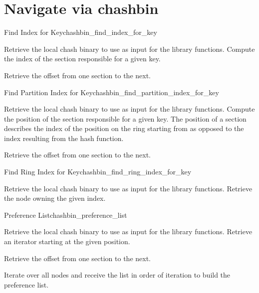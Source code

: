 \section{Navigate via chashbin}

\begin{actionbox}{Find Index for Key}{chashbin_find_index_for_key}
	\begin{action}
		 Retrieve the local chash binary to use as input for the library functions.
		 Compute the index of the section responsible for a given key.
		\begin{action}
			 Retrieve the offset from one section to the next.
		\end{action}
	\end{action}
\end{actionbox}

\begin{actionbox}{Find Partition Index for Key}{chashbin_find_partition_index_for_key}
	\begin{action}
		 Retrieve the local chash binary to use as input for the library functions.
		 Compute the position of the section responsible for a given key.
		The position of a section describes the index of the position on the ring starting from as opposed to the index resulting from the hash function.
		\begin{action}
			 Retrieve the offset from one section to the next.
		\end{action}
	\end{action}
\end{actionbox}

\begin{actionbox}{Find Ring Index for Key}{chashbin_find_ring_index_for_key}
	\begin{action}
		 Retrieve the local chash binary to use as input for the library functions.
		 Retrieve the node owning the given index.
	\end{action}
\end{actionbox}

\begin{actionbox}{Preference List}{chashbin_preference_list}
	\begin{action}
		 Retrieve the local chash binary to use as input for the library functions.
		 Retrieve an iterator starting at the given position.
		\begin{action}
			 Retrieve the offset from one section to the next.
		\end{action}
		 Iterate over all nodes and receive the list in order of iteration to build the preference list.
	\end{action}
\end{actionbox}

